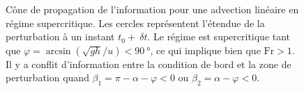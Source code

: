 \begin{figure}
    \centering
    
    \caption{Cône de propagation de l'information pour une advection linéaire en régime supercritique. Les cercles représentent l'étendue de la perturbation à un instant $t_0+~\delta t$. Le régime est supercritique tant que $\varphi=\arcsin\left(\sqrt{gh}/u\right)<\SI{90}{\degree}$, ce qui implique bien que $\mathrm{Fr}>1$. Il y a conflit d'information entre la condition de bord et la zone de perturbation quand $\beta_1=\pi-\alpha-\varphi<0$ ou $\beta_2=\alpha-\varphi<0$.}
    \label{fig:cone_propagation}
\end{figure}
